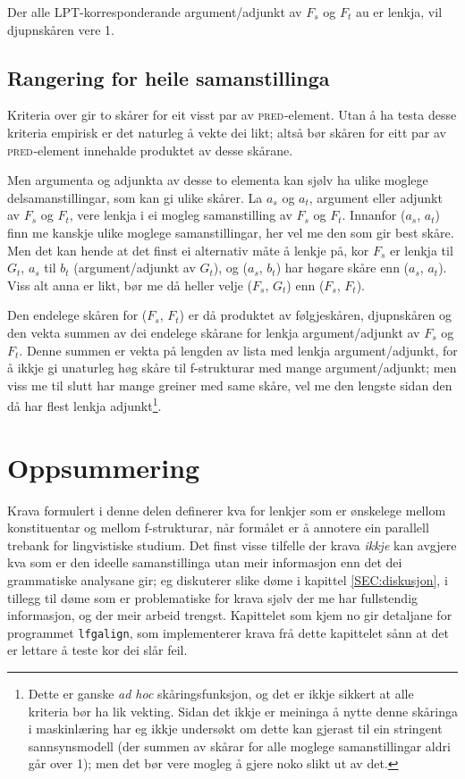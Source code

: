 \documentclass[12pt,a4paper,oneside,draft]{report}
\newcommand{\F}[2]{\textsc{#1}\ensuremath{_{#2}}}
\newcommand{\PRED}{\F{pred}{}}
\begin{document}
Der alle LPT\hyp{}korresponderande argument/adjunkt av $F_s$ og $F_t$ au er
lenkja, vil djupnskåren vere 1.

\subsection{Rangering for heile samanstillinga}
\label{sec-3.8.3}

Kriteria over gir to skårer for eit visst par av \PRED{}-element. Utan å
ha testa desse kriteria empirisk er det naturleg å vekte dei likt;
altså bør skåren for eitt par av \PRED{}-element innehalde produktet av
desse skårane.

Men argumenta og adjunkta av desse to elementa kan sjølv ha ulike
moglege delsamanstillingar, som kan gi ulike skårer. La $a_s$ og
$a_t$, argument eller adjunkt av $F_s$ og $F_t$, vere lenkja i ei
mogleg samanstilling av $F_s$ og $F_t$. Innanfor ($a_s$, $a_t$) finn
me kanskje ulike moglege samanstillingar, her vel me den som gir best
skåre. Men det kan hende at det finst ei alternativ måte å lenkje på,
kor $F_s$ er lenkja til $G_t$, $a_s$ til $b_t$ (argument/adjunkt av
$G_t$), og ($a_s$, $b_t$) har høgare skåre enn ($a_s$, $a_t$). Viss
alt anna er likt, bør me då heller velje ($F_s$, $G_t$) enn ($F_s$,
$F_t$).

Den endelege skåren for ($F_s$, $F_t$) er då produktet av følgjeskåren,
djupnskåren og den vekta summen av dei endelege skårane for lenkja
argument/adjunkt av $F_s$ og $F_t$. Denne summen er vekta på lengden
av lista med lenkja argument/adjunkt, for å ikkje gi unaturleg høg
skåre til f\hyp{}strukturar med mange argument/adjunkt; men viss me til
slutt har mange greiner med same skåre, vel me den lengste sidan den
då har flest lenkja adjunkt\footnote{Dette er ganske \emph{ad hoc} skåringsfunksjon, og det er ikkje
        sikkert at alle kriteria bør ha lik vekting.  Sidan det ikkje
        er meininga å nytte denne skåringa i maskinlæring har eg ikkje
        undersøkt om dette kan gjerast til ein stringent
        sannsynsmodell (der summen av skårar for alle moglege
        samanstillingar aldri går over 1); men det bør vere mogleg å
        gjere noko slikt ut av det. }.



\section{Oppsummering}
\label{sec-3.9}

Krava formulert i denne delen definerer kva for lenkjer som er
 ønskelege mellom konstituentar og mellom f\hyp{}strukturar, når
 formålet er å annotere ein parallell trebank for lingvistiske
 studium. Det finst visse tilfelle der krava \emph{ikkje} kan avgjere kva
 som er den ideelle samanstillinga utan meir informasjon enn det dei
 grammatiske analysane gir; eg diskuterer slike døme i kapittel
 \ref{SEC:diskusjon}, i tillegg til døme som er problematiske for
 krava sjølv der me har fullstendig informasjon, og der meir arbeid
 trengst. Kapittelet som kjem no gir detaljane for programmet
 \texttt{lfgalign}, som implementerer krava frå dette kapittelet sånn at det
 er lettare å teste kor dei slår feil.
\end{document}
